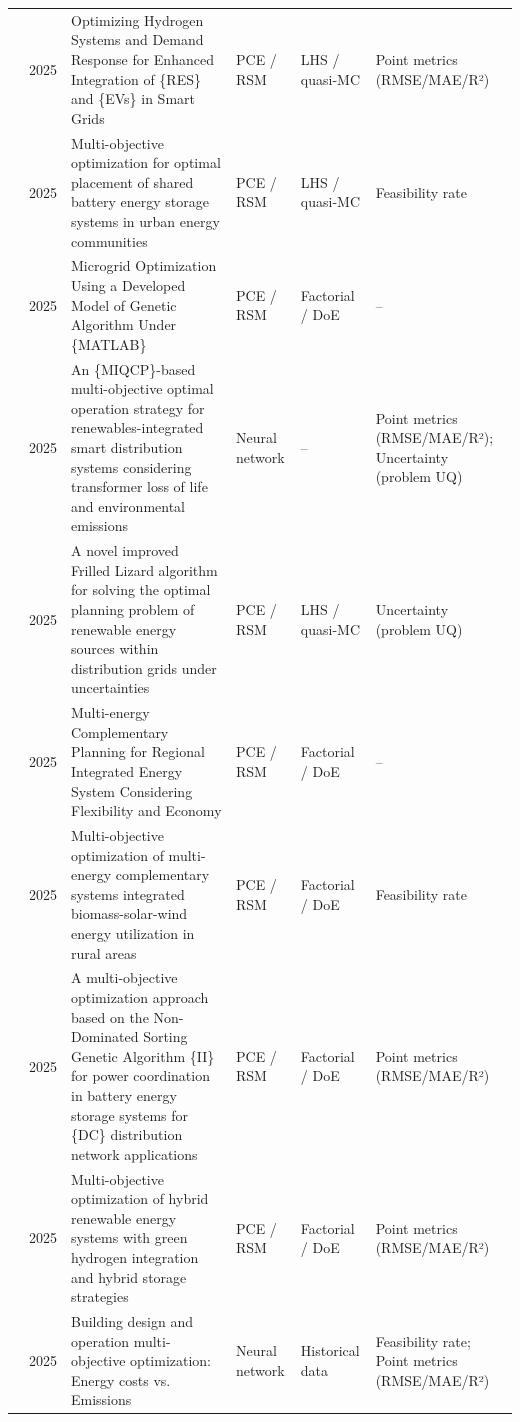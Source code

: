 \begin{longtable}{@{}p{} p{} p{} p{} p{} p{}@{}}
  \cite{ali_optimizing_2025} & 2025 & Optimizing Hydrogen Systems and Demand Response for Enhanced Integration of \{RES\} and \{EVs\} in Smart Grids & PCE / RSM & LHS / quasi-MC & Point metrics (RMSE/MAE/R²) \\
  \cite{an_multi-objective_2025} & 2025 & Multi-objective optimization for optimal placement of shared battery energy storage systems in urban energy communities & PCE / RSM & LHS / quasi-MC & Feasibility rate \\
  \cite{anoune_microgrid_2025} & 2025 & Microgrid Optimization Using a Developed Model of Genetic Algorithm Under \{MATLAB\} & PCE / RSM & Factorial / DoE & -- \\
  \cite{bagheri_miqcp-based_2025} & 2025 & An \{MIQCP\}-based multi-objective optimal operation strategy for renewables-integrated smart distribution systems considering transformer loss of life and environmental emissions & Neural network & -- & Point metrics (RMSE/MAE/R²); Uncertainty (problem UQ) \\
  \cite{bendriss_novel_2025} & 2025 & A novel improved Frilled Lizard algorithm for solving the optimal planning problem of renewable energy sources within distribution grids under uncertainties & PCE / RSM & LHS / quasi-MC & Uncertainty (problem UQ) \\
  \cite{bian_multi-energy_2025} & 2025 & Multi-energy Complementary Planning for Regional Integrated Energy System Considering Flexibility and Economy & PCE / RSM & Factorial / DoE & -- \\
  \cite{chen_multi-objective_2025-1} & 2025 & Multi-objective optimization of multi-energy complementary systems integrated biomass-solar-wind energy utilization in rural areas & PCE / RSM & Factorial / DoE & Feasibility rate \\
  \cite{cortes-caicedo_multi-objective_2025} & 2025 & A multi-objective optimization approach based on the Non-Dominated Sorting Genetic Algorithm \{II\} for power coordination in battery energy storage systems for \{DC\} distribution network applications & PCE / RSM & Factorial / DoE & Point metrics (RMSE/MAE/R²) \\
  \cite{tezer_multi-objective_2025} & 2025 & Multi-objective optimization of hybrid renewable energy systems with green hydrogen integration and hybrid storage strategies & PCE / RSM & Factorial / DoE & Point metrics (RMSE/MAE/R²) \\
  \cite{tian_building_2025} & 2025 & Building design and operation multi-objective optimization: Energy costs vs. Emissions & Neural network & Historical data & Feasibility rate; Point metrics (RMSE/MAE/R²) \\

\end{longtable}
